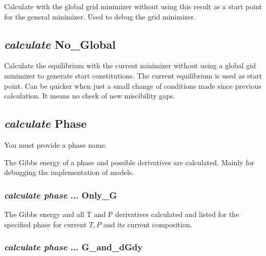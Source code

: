 \documentclass[12pt]{article}
\begin{document}
Calculate with the global grid minimizer without using this result as a
start point for the general minimizer.  Used to debug the grid
minimizer.

\subsection{{\em calculate} No\_Global}

Calculate the equilibrium with the current minimizer without using a
global gid minimizer to generate start constitutions.  The current
equilibrium is used as start point.  Can be quicker when just a small
change of conditions made since previous calculation.  It means no
check of new miscibility gaps.

\subsection{{\em calculate} Phase}

You must provide a phase name.

The Gibbs energy of a phase and possible derivatives are calculated.
Mainly for debugging the implementation of models.

\subsubsection{{\em calculate phase} ... Only\_G}

The Gibbs energy and all T and P derivatives calculated and listed for
the specified phase for current $T,P$ and its current composition.

\subsubsection{{\em calculate phase} ... G\_and\_dGdy}
\end{document}
